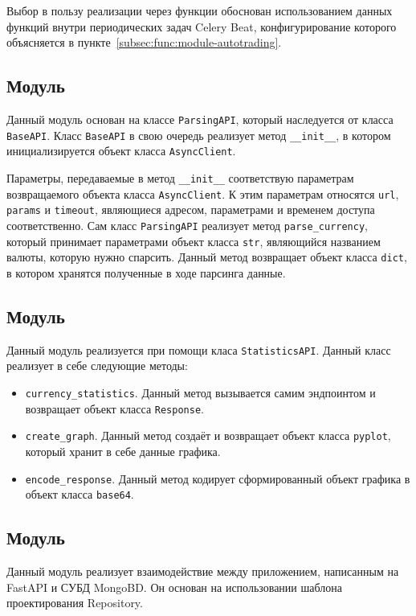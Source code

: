 Выбор в пользу реализации через функции обоснован использованием данных функций внутри периодических задач Celery Beat,
конфигурирование которого объясняется в пункте~\ref{subsec:func:module-autotrading}.

\subsection{Модуль \moduleParsing}\label{subsec:func:module-parcing}
Данный модуль основан на классе \lstinline{ParsingAPI}, который наследуется от класса \lstinline{BaseAPI}.
Класс \lstinline{BaseAPI} в свою очередь реализует метод \lstinline{__init__},
в котором инициализируется объект класса \lstinline{AsyncClient}.

Параметры, передаваемые в метод \lstinline{__init__} соответствую параметрам возвращаемого объекта класса \lstinline{AsyncClient}.
К этим параметрам относятся \lstinline{url}, \lstinline{params} и \lstinline{timeout}, являющиеся адресом, параметрами и временем доступа соответственно.
Сам класс \lstinline{ParsingAPI} реализует метод \lstinline{parse_currency}, который принимает параметрами объект класса \lstinline{str}, являющийся названием валюты, которую нужно спарсить.
Данный метод возвращает объект класса \lstinline{dict}, в котором хранятся полученные в ходе парсинга данные.

\subsection{Модуль \moduleStatistics}\label{subsec:func:module-statistics}
Данный модуль реализуется при помощи класа \lstinline{StatisticsAPI}.
Данный класс реализует в себе следующие методы:
\begin{itemize}
    \item \lstinline{currency_statistics}.
    Данный метод вызывается самим эндпоинтом и возвращает объект класса \lstinline{Response}.
    \item \lstinline{create_graph}.
    Данный метод создаёт и возвращает объект класса \lstinline{pyplot}, который хранит в себе данные графика.
    \item \lstinline{encode_response}.
    Данный метод кодирует сформированный объект графика в объект класса \lstinline{base64}.
\end{itemize}

\subsection{Модуль \moduleCommunicationMongoDB}\label{subsec:func:module-mongodb}
Данный модуль реализует взаимодействие между приложением, написанным на FastAPI и СУБД MongoBD.
Он основан на использовании шаблона проектирования Repository.

